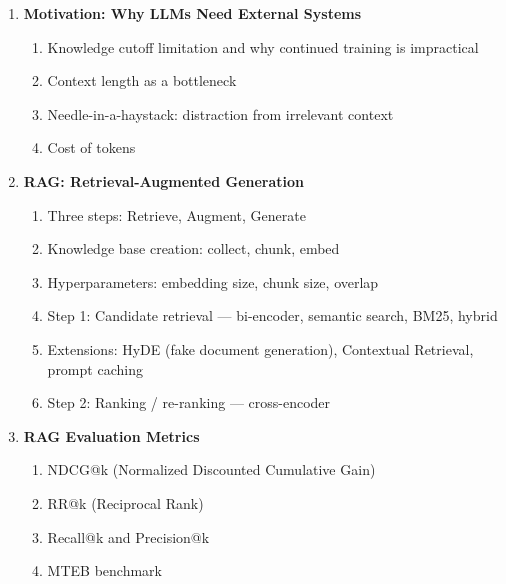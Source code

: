 \documentclass[11pt, a4paper]{article}
\begin{document}
\begin{enumerate}[label=\textbf{\arabic*.}, leftmargin=2em]
  \item \textbf{Motivation: Why LLMs Need External Systems}
    \begin{enumerate}[label=\arabic{enumi}.\arabic*]
      \item Knowledge cutoff limitation and why continued training is impractical
      \item Context length as a bottleneck
      \item Needle-in-a-haystack: distraction from irrelevant context
      \item Cost of tokens
    \end{enumerate}

  \item \textbf{RAG: Retrieval-Augmented Generation}
    \begin{enumerate}[label=\arabic{enumi}.\arabic*]
      \item Three steps: Retrieve, Augment, Generate
      \item Knowledge base creation: collect, chunk, embed
      \item Hyperparameters: embedding size, chunk size, overlap
      \item Step 1: Candidate retrieval --- bi-encoder, semantic search, BM25, hybrid
      \item Extensions: HyDE (fake document generation), Contextual Retrieval, prompt caching
      \item Step 2: Ranking / re-ranking --- cross-encoder
    \end{enumerate}

  \item \textbf{RAG Evaluation Metrics}
    \begin{enumerate}[label=\arabic{enumi}.\arabic*]
      \item NDCG@k (Normalized Discounted Cumulative Gain)
      \item RR@k (Reciprocal Rank)
      \item Recall@k and Precision@k
      \item MTEB benchmark
    \end{enumerate}


\end{enumerate}
\end{document}
